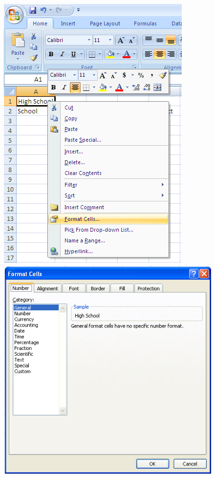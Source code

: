 \begin{figure}[H]
\centering
\includegraphics[scale=0.4]{src/images/chapter1/chapter1_fig40.png}\qquad
\includegraphics[scale=0.4]{src/images/chapter1/chapter1_fig41.png}
\end{figure}								
	
